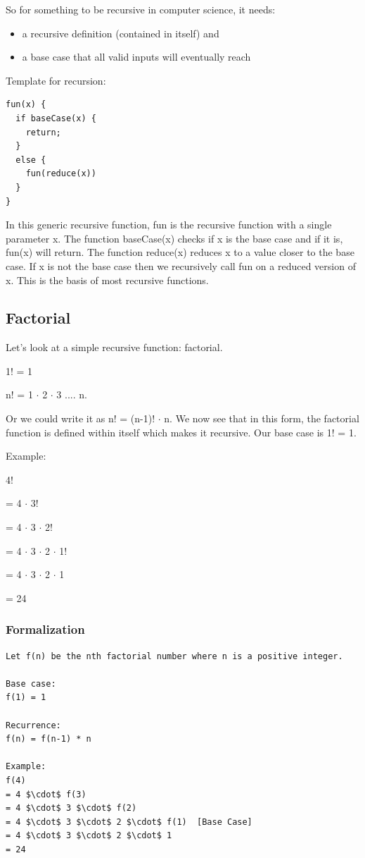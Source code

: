\documentclass[11pt,oneside]{book}
\begin{document}
So for something to be recursive in computer science, it needs:

\begin{itemize}
\item a recursive definition (contained in itself) and 
\item a base case that all valid inputs will eventually reach
\end{itemize}

Template for recursion:

\begin{lstlisting}
fun(x) {
  if baseCase(x) {
    return;
  }
  else {
    fun(reduce(x))
  }
}
\end{lstlisting}

In this generic recursive function, fun is the recursive function with a single parameter x. The function baseCase(x) checks if x is the base case and if it is, fun(x) will return. The function reduce(x) reduces x to a value closer to the base case. If x is not the base case then we recursively call fun on a reduced version of x. This is the basis of most recursive functions.

\subsection{Factorial}

Let's look at a simple recursive function: factorial.

1! = 1

n! = 1 $\cdot$ 2 $\cdot$ 3 .... n.

Or we could write it as n! = (n-1)! $\cdot$ n. We now see that in this form, the factorial function is defined within itself which makes it recursive. Our base case is 1! = 1.

Example:

4!

= 4 $\cdot$ 3!

= 4 $\cdot$ 3 $\cdot$ 2!

= 4 $\cdot$ 3 $\cdot$ 2 $\cdot$ 1!

= 4 $\cdot$ 3 $\cdot$ 2 $\cdot$ 1

= 24

\subsubsection{Formalization}

\begin{lstlisting}
Let f(n) be the nth factorial number where n is a positive integer.

Base case:
f(1) = 1

Recurrence:
f(n) = f(n-1) * n

Example:
f(4) 
= 4 $\cdot$ f(3)
= 4 $\cdot$ 3 $\cdot$ f(2)
= 4 $\cdot$ 3 $\cdot$ 2 $\cdot$ f(1)  [Base Case]
= 4 $\cdot$ 3 $\cdot$ 2 $\cdot$ 1
= 24
\end{lstlisting}
\end{document}
